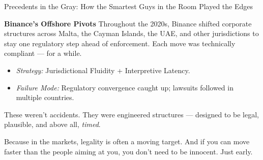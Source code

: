 \begin{HistoricalSidebar}{Precedents in the Gray: How the Smartest Guys in the Room Played the Edges}
  \medskip
  
  \textbf{Binance’s Offshore Pivots}  
  Throughout the 2020s, Binance shifted corporate structures across Malta, the Cayman Islands, the UAE, and 
  other jurisdictions  to stay one regulatory step ahead of enforcement.  
  Each move was technically compliant — for a while.
  
  \begin{itemize}
    \item \textit{Strategy:} Jurisdictional Fluidity + Interpretive Latency.
    \item \textit{Failure Mode:} Regulatory convergence caught up; lawsuits followed in multiple countries.
  \end{itemize}
  
  \medskip
  
  These weren’t accidents.  
  They were engineered structures — designed to be legal, plausible, and above all, \textit{timed}.
  
  Because in the markets, legality is often a moving target.  
  And if you can move faster than the people aiming at you,  
  you don’t need to be innocent.  
  Just early.
  
\end{HistoricalSidebar}

\medskip

